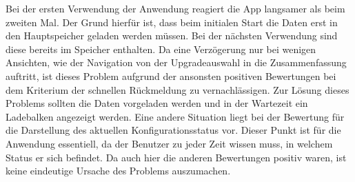 Bei der ersten Verwendung der Anwendung reagiert die App langsamer als beim zweiten Mal. Der Grund hierfür ist, dass beim initialen Start die Daten erst in den Hauptspeicher geladen werden müssen. Bei der nächsten Verwendung sind diese bereits im Speicher enthalten. Da eine Verzögerung nur bei wenigen Ansichten, wie der Navigation von der Upgradeauswahl in die Zusammenfassung auftritt, ist dieses Problem aufgrund der ansonsten positiven Bewertungen bei dem Kriterium der schnellen Rückmeldung zu vernachlässigen. Zur Lösung dieses Problems sollten die Daten vorgeladen werden und in der Wartezeit ein Ladebalken angezeigt werden. Eine andere Situation liegt bei der Bewertung für die Darstellung des aktuellen Konfigurationsstatus vor. Dieser Punkt ist für die Anwendung essentiell, da der Benutzer zu jeder Zeit wissen muss, in welchem Status er sich befindet. Da auch hier die anderen Bewertungen positiv waren, ist keine eindeutige Ursache des Problems auszumachen.

